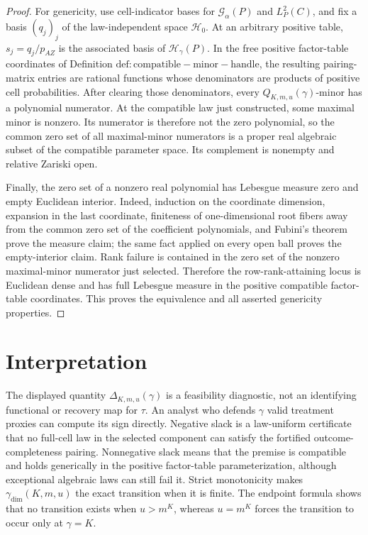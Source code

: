 \documentclass{article}
\begin{document}
\begin{proof}
For genericity, use cell-indicator bases for \(\mathcal G_\alpha(P)\) and \(L_P^2(C)\), and fix a basis \((q_j)_j\) of the law-independent space \(\mathcal H_0\). At an arbitrary positive table, \(s_j=q_j/p_{AZ}\) is the associated basis of \(\mathcal H_\gamma(P)\). In the free positive factor-table coordinates of Definition \(\mathrm{def:compatible-minor-handle}\), the resulting pairing-matrix entries are rational functions whose denominators are products of positive cell probabilities. After clearing those denominators, every \(Q_{K,m,u}(\gamma)\)-minor has a polynomial numerator. At the compatible law just constructed, some maximal minor is nonzero. Its numerator is therefore not the zero polynomial, so the common zero set of all maximal-minor numerators is a proper real algebraic subset of the compatible parameter space. Its complement is nonempty and relative Zariski open.

Finally, the zero set of a nonzero real polynomial has Lebesgue measure zero and empty Euclidean interior. Indeed, induction on the coordinate dimension, expansion in the last coordinate, finiteness of one-dimensional root fibers away from the common zero set of the coefficient polynomials, and Fubini's theorem prove the measure claim; the same fact applied on every open ball proves the empty-interior claim. Rank failure is contained in the zero set of the nonzero maximal-minor numerator just selected. Therefore the row-rank-attaining locus is Euclidean dense and has full Lebesgue measure in the positive compatible factor-table coordinates. This proves the equivalence and all asserted genericity properties.
\end{proof}

\section{Interpretation}

The displayed quantity \(\Delta_{K,m,u}(\gamma)\) is a feasibility diagnostic, not an identifying functional or recovery map for \(\tau\). An analyst who defends \(\gamma\) valid treatment proxies can compute its sign directly. Negative slack is a law-uniform certificate that no full-cell law in the selected component can satisfy the fortified outcome-completeness pairing. Nonnegative slack means that the premise is compatible and holds generically in the positive factor-table parameterization, although exceptional algebraic laws can still fail it. Strict monotonicity makes \(\gamma_{\mathrm{dim}}(K,m,u)\) the exact transition when it is finite. The endpoint formula shows that no transition exists when \(u>m^K\), whereas \(u=m^K\) forces the transition to occur only at \(\gamma=K\).
\end{document}
